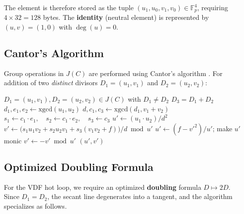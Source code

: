 \documentclass[11pt,a4paper]{article}
\begin{document}
The element is therefore stored as the tuple $(u_1, u_0, v_1, v_0) \in \mathbb{F}_p^4$, requiring $4 \times 32 = 128$ bytes. The \textbf{identity} (neutral element) is represented by $(u, v) = (1, 0)$ with $\deg(u) = 0$.

\subsection{Cantor's Algorithm}

Group operations in $J(C)$ are performed using Cantor's algorithm \cite{cantor1987}. For addition of two \emph{distinct} divisors $D_1 = (u_1, v_1)$ and $D_2 = (u_2, v_2)$:

\begin{algorithm}[H]
\caption{Cantor's Algorithm for Jacobian Addition}
\label{alg:cantor-add}
\begin{algorithmic}[1]
\Require $D_1 = (u_1, v_1), D_2 = (u_2, v_2) \in J(C)$ with $D_1 \neq D_2$
\Ensure $D_3 = D_1 + D_2$
\State $d_1, e_1, e_2 \gets \mathrm{xgcd}(u_1, u_2)$ 
\State $d, c_1, c_3 \gets \mathrm{xgcd}(d_1, v_1 + v_2)$ 
\State $s_1 \gets c_1 \cdot e_1, \quad s_2 \gets c_1 \cdot e_2, \quad s_3 \gets c_3$
\State $u' \gets (u_1 \cdot u_2) / d^2$ 
\State $v' \gets \bigl(s_1 u_1 v_2 + s_2 u_2 v_1 + s_3(v_1 v_2 + f)\bigr) / d \bmod u'$
 
    \State $u' \gets (f - v'^2) / u'$; \quad make $u'$ monic
    \State $v' \gets -v' \bmod u'$
\EndWhile
\State \Return $(u', v')$
\end{algorithmic}
\end{algorithm}

\subsection{Optimized Doubling Formula}
\label{sec:doubling-formula}

For the VDF hot loop, we require an optimized \textbf{doubling} formula $D \mapsto 2D$. Since $D_1 = D_2$, the secant line degenerates into a tangent, and the algorithm specializes as follows.
\end{document}
